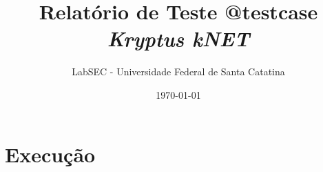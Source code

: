 \documentclass[a4paper]{report}
\title{Relatório de Teste @testcase \\ \emph{Kryptus kNET} }
\author{LabSEC - Universidade Federal de Santa Catatina}
\date{\today}
\begin{document}
\maketitle

\section{Execução}
\begin{alltt}
	\small
	
\end{alltt}
\end{document}
